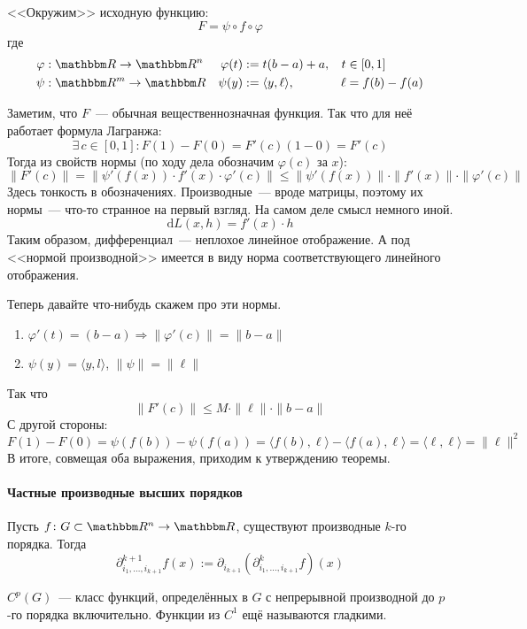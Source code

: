 \documentclass[12pt,timbord]{../../../notes}
\begin{document}
\begin{ittproof}
  <<Окружим>>  исходную функцию:
  \[
    F = \psi \circ f \circ \varphi
  \]
  где 
  \begin{align*}
    \varphi&: \R \to \R^n & \varphi(t) &:= t(b-a) + a, & t&\in [0,1] \\
    \psi&: \R^m \to \R & \psi(y) &:= \langle y, \ell \rangle, & \ell &= f(b)-f(a) 
  \end{align*}
  
  Заметим, что $F$~--- обычная вещественнозначная функция. Так что для неё работает формула
  Лагранжа:
  \[
    \exists\, c \in [0,1] \colon F(1)-F(0) = F'(c)(1-0) = F'(c)
  \]
  Тогда из свойств нормы (по ходу дела обозначим $\varphi(c)$ за $x$):
  \[
    \|F'(c)\| = \|\psi'(f(x)) \cdot f'(x) \cdot \varphi'(c)\| \leqslant 
    \|\psi'(f(x)) \| \cdot \| f'(x) \| \cdot \| \varphi'(c)\|
  \]
  Здесь тонкость в обозначениях. Производные~--- вроде матрицы, поэтому их нормы~--- что-то
  странное на первый взгляд. На самом деле смысл немного иной. 
  \[
    \mathrm d L(x, h) = f'(x) \cdot h
  \]
  Таким образом, дифференциал~--- неплохое линейное отображение. А под <<нормой производной>>
  имеется в виду норма соответствующего линейного отображения.

  Теперь давайте что-нибудь скажем про эти нормы. 

  \begin{enumerate}
    \item $\varphi'(t) = (b-a) \Rightarrow \| \varphi'(c) \| = \| b - a\|$
    \item $\psi(y) = \langle y, l \rangle$, $\| \psi\| = \|\ell\|$      
  \end{enumerate}
  Так что 
  \[
    \| F'(c)\| \leqslant M \cdot \| \ell \| \cdot \|b-a\|
  \]
  С другой стороны:
  \[
    F(1) - F(0) = \psi(f(b)) - \psi(f(a)) = \langle f(b), \ell \rangle - \langle f(a), \ell \rangle
    = \langle \ell, \ell \rangle  = \|\ell \|^2
  \]
  В итоге, совмещая оба выражения, приходим к утверждению теоремы.
\end{ittproof}

\paragraph{Частные производные высших порядков}
\label{par:diffspace::highpartial}

\begin{defn}\label{defn:diffspace::highpartial}
  Пусть $f \colon G \subset \R^n \to \R$, существуют производные $k$-го порядка. Тогда
  \[
    \partial_{i_1, \dotsc, i_{k+1}}^{k+1} f(x) := \partial_{i_{k+1}}(\partial^k_{i_1, \dotsc, i_{k+1}} f) (x)
  \]
\end{defn}
\begin{rem}\label{rem:diffspace::highpartial::smooth}
  $C^p(G)$~--- класс функций, определённых в $G$ с непрерывной производной до $p$-го порядка
  включительно.
  Функции из $C^1$ ещё называются гладкими.
\end{rem}
\end{document}
